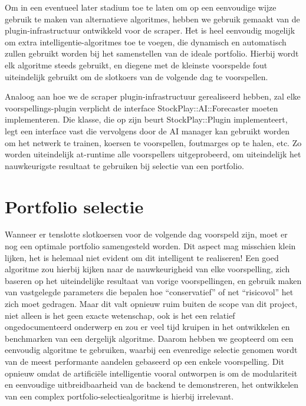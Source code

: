 Om in een eventueel later stadium toe te laten om op een eenvoudige wijze gebruik te maken van alternatieve algoritmes, hebben we gebruik gemaakt van de plugin-infrastructuur ontwikkeld voor de scraper. Het is heel eenvoudig mogelijk om extra intelligentie-algoritmes toe te voegen, die dynamisch en automatisch zullen gebruikt worden bij het samenstellen van de ideale portfolio. Hierbij wordt elk algoritme steeds gebruikt, en diegene met de kleinste voorspelde fout uiteindelijk gebruikt om de slotkoers van de volgende dag te voorspellen.

Analoog aan hoe we de scraper plugin-infrastructuur gerealiseerd hebben, zal elke voorspellings-plugin  verplicht de interface StockPlay::AI::Forecaster moeten implementeren. Die klasse, die op zijn beurt StockPlay::Plugin implementeert, legt een interface vast die vervolgens door de AI manager kan gebruikt worden om het netwerk te trainen, koersen te voorspellen, foutmarges op te halen, etc. Zo worden uiteindelijk at-runtime alle voorspellers uitgeprobeerd, om uiteindelijk het nauwkeurigste resultaat te gebruiken bij selectie van een portfolio.


\section{Portfolio selectie}

Wanneer er tenslotte slotkoersen voor de volgende dag voorspeld zijn, moet er nog een optimale portfolio samengesteld worden. Dit aspect mag misschien klein lijken, het is helemaal niet evident om dit intelligent te realiseren! Een goed algoritme zou hierbij kijken naar de nauwkeurigheid van elke voorspelling, zich baseren op het uiteindelijke resultaat van vorige voorspellingen, en gebruik maken van vastgelegde parameters die bepalen hoe ``conservatief'' of net ``risicovol'' het zich moet gedragen. Maar dit valt opnieuw ruim buiten de scope van dit project, niet alleen is het geen exacte wetenschap, ook is het een relatief ongedocumenteerd onderwerp en zou er veel tijd kruipen in het ontwikkelen en benchmarken van een dergelijk algoritme. Daarom hebben we geopteerd om een eenvoudig algoritme te gebruiken, waarbij een evenredige selectie genomen wordt van de meest performante aandelen gebaseerd op een enkele voorspelling. Dit opnieuw omdat de artifici\"ele intelligentie vooral ontworpen is om de modulariteit en eenvoudige uitbreidbaarheid van de backend te demonstreren, het ontwikkelen van een complex portfolio-selectiealgoritme is hierbij irrelevant.


